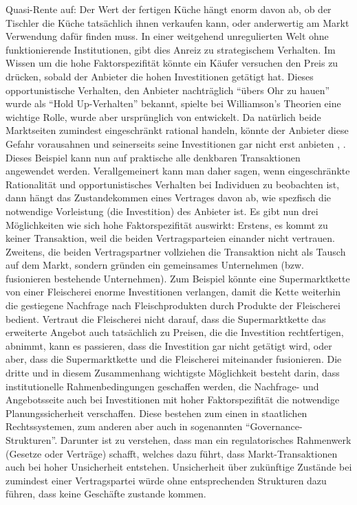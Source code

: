 Quasi-Rente auf: Der Wert der fertigen Küche hängt enorm davon ab, ob der Tischler die Küche tatsächlich ihnen verkaufen kann, oder anderwertig am Markt Verwendung dafür finden muss. In einer weitgehend unregulierten Welt ohne funktionierende Institutionen, gibt dies Anreiz zu strategischem Verhalten. Im Wissen um die hohe Faktorspezifität könnte ein Käufer versuchen den Preis zu drücken, sobald der Anbieter die hohen Investitionen getätigt hat. Dieses opportunistische Verhalten, den Anbieter nachträglich "`übers Ohr zu hauen"' wurde als "`Hold Up-Verhalten"' bekannt, spielte bei Williamson's Theorien eine wichtige Rolle, wurde aber ursprünglich von \textcite{Klein1978} entwickelt. Da natürlich beide Marktseiten zumindest eingeschränkt rational handeln, könnte der Anbieter diese Gefahr vorausahnen und seinerseits seine Investitionen gar nicht erst anbieten \parencite[S. 88]{Voigt2009}, \parencite[S. 181]{Erlei2016}. Dieses Beispiel kann nun auf praktische alle denkbaren Transaktionen angewendet werden. Verallgemeinert kann man daher sagen, wenn eingeschränkte Rationalität und opportunistisches Verhalten bei Individuen zu beobachten ist, dann hängt das Zustandekommen eines Vertrages davon ab, wie spezfisch die notwendige Vorleistung (die Investition) des Anbieter ist. Es gibt nun drei Möglichkeiten wie sich hohe Faktorspezifität auswirkt: Erstens, es kommt zu keiner Transaktion, weil die beiden Vertragsparteien einander nicht vertrauen. Zweitens, die beiden Vertragspartner vollziehen die Transaktion nicht als Tausch auf dem Markt, sondern gründen ein gemeinsames Unternehmen (bzw. fusionieren bestehende Unternehmen). Zum Beispiel könnte eine Supermarktkette von einer Fleischerei enorme Investitionen verlangen, damit die Kette weiterhin die gestiegene Nachfrage nach Fleischprodukten durch Produkte der Fleischerei bedient. Vertraut die Fleischerei nicht darauf, dass die Supermarktkette das erweiterte Angebot auch tatsächlich zu Preisen, die die Investition rechtfertigen, abnimmt, kann es passieren, dass die Investition gar nicht getätigt wird, oder aber, dass die Supermarktkette und die Fleischerei miteinander fusionieren. Die dritte und in diesem Zusammenhang wichtigste Möglichkeit besteht darin, dass institutionelle Rahmenbedingungen geschaffen werden, die Nachfrage- und Angebotsseite auch bei Investitionen mit hoher Faktorspezifität die notwendige Planungssicherheit verschaffen. Diese bestehen zum einen in staatlichen Rechtssystemen, zum anderen aber auch in sogenannten "`Governance-Strukturen"'. Darunter ist zu verstehen, dass man ein regulatorisches Rahmenwerk (Gesetze oder Verträge) schafft, welches dazu führt, dass Markt-Transaktionen auch bei hoher Unsicherheit entstehen. Unsicherheit über zukünftige Zustände bei zumindest einer Vertragspartei würde ohne entsprechenden Strukturen dazu führen, dass keine Geschäfte zustande kommen.

